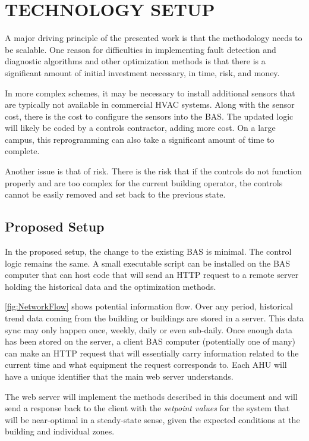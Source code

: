 \chapter{\texorpdfstring{\MakeUppercase{Technology Setup}}{Technology Setup}}

A major driving principle of the presented work is that the methodology
needs to be scalable. One reason for difficulties in implementing fault
detection and diagnostic algorithms and other optimization methods is
that there is a significant amount of initial investment necessary, in
time, risk, and money. 

In more complex schemes, it may be necessary to install additional
sensors that are typically not available in commercial HVAC systems.
Along with the sensor cost, there is the cost to configure the sensors
into the BAS. The updated logic will likely be coded by a controls
contractor, adding more cost. On a large campus, this reprogramming can
also take a significant amount of time to complete. 

Another issue is that of risk. There is the risk that if the controls do
not function properly and are too complex for the current building
operator, the controls cannot be easily removed and set back to the 
previous state. 


\section{Proposed Setup}

In the proposed setup, the change to the existing BAS is
minimal. The control logic remains the same. A small executable
script can be installed on the BAS computer that can host code that will
send an HTTP request to a remote server holding the historical data and
the optimization methods. 


\figref{} \ref{fig:NetworkFlow} shows potential information flow. Over
any period, historical trend data coming from the building or buildings
are stored in a server.  This data sync may only happen once, weekly,
daily or even sub-daily.  Once enough data has been stored on the
server, a client BAS computer (potentially one of many) can make an HTTP
request that will essentially carry information related to the current
time and what equipment the request corresponds to. Each AHU will have a
unique identifier that the main web server understands. 

The web server will implement the methods described in this document and
will send a response back to the client with the \textit{setpoint
values} for the system that will be near-optimal in a steady-state
sense, given the expected conditions at the building and individual
zones. 

